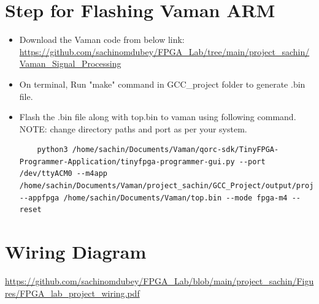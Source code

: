 \documentclass[journal,12pt,twocolumn]{IEEEtran}
\begin{document}
\section{Step for Flashing Vaman ARM}
\begin{itemize}
    \item Download the Vaman code from below link:\\
    \url{https://github.com/sachinomdubey/FPGA_Lab/tree/main/project_sachin/Vaman_Signal_Processing}
    \item On terminal, Run "make" command in GCC\_project folder to generate .bin file.
    \item Flash the .bin file along with top.bin to vaman using following command. NOTE: change directory paths and port as per your system.
    \begin{lstlisting}
    python3 /home/sachin/Documents/Vaman/qorc-sdk/TinyFPGA-Programmer-Application/tinyfpga-programmer-gui.py --port /dev/ttyACM0 --m4app /home/sachin/Documents/Vaman/project_sachin/GCC_Project/output/project_sachin.bin --appfpga /home/sachin/Documents/Vaman/top.bin --mode fpga-m4 --reset
    \end{lstlisting}
\end{itemize}
\section{Wiring Diagram}
\url{https://github.com/sachinomdubey/FPGA_Lab/blob/main/project_sachin/Figures/FPGA_lab_project_wiring.pdf}
\end{document}
